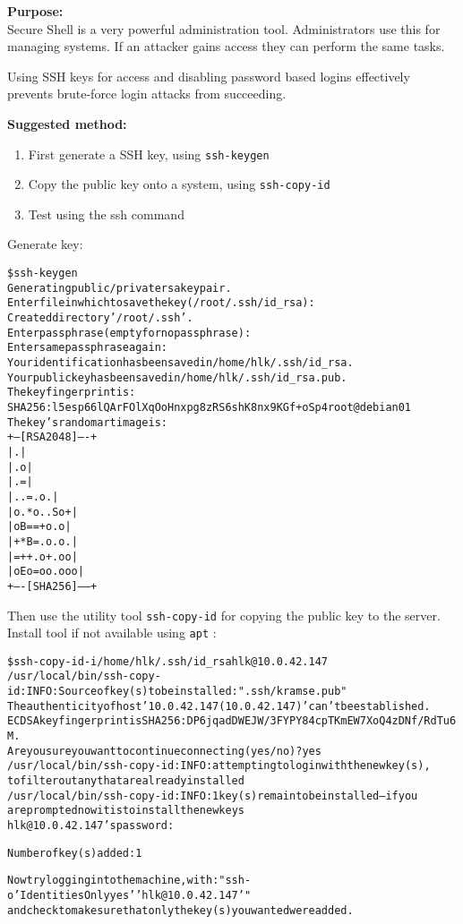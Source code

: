 \documentclass[a4paper,11pt,notitlepage]{report}
\begin{document}
{\bf Purpose:}\\
Secure Shell is a very powerful administration tool. Administrators use this for managing systems. If an attacker gains access they can perform the same tasks.

Using SSH keys for access and disabling password based logins effectively prevents brute-force login attacks from succeeding.

{\bf Suggested method:}\\

\begin{enumerate}
\item First generate a SSH key, using \verb+ssh-keygen+
\item Copy the public key onto a system, using \verb+ssh-copy-id+
\item Test using the ssh command
\end{enumerate}

Generate key:
\begin{alltt}
\$ ssh-keygen
Generating public/private rsa key pair.
Enter file in which to save the key (/root/.ssh/id_rsa):
Created directory '/root/.ssh'.
Enter passphrase (empty for no passphrase):
Enter same passphrase again:
Your identification has been saved in /home/hlk/.ssh/id_rsa.
Your public key has been saved in /home/hlk/.ssh/id_rsa.pub.
The key fingerprint is:
SHA256:l5esp66lQArFOlXqOoHnxpg8zRS6shK8nx9KGf+oSp4 root@debian01
The key's randomart image is:
+---[RSA 2048]----+
|      .          |
|   . o           |
|   .=            |
| ..=.      o .   |
|o.*o. . S o +    |
|oB==+o   . o     |
|+*B=.o.   o .    |
|=++.o +. o o     |
|oEo=oo .ooo      |
+----[SHA256]-----+
\end{alltt}

Then use the utility tool \verb+ssh-copy-id+ for copying the public key to the server. Install tool if not available using \verb+apt+ :
\begin{alltt}
\$ ssh-copy-id -i /home/hlk/.ssh/id_rsa hlk@10.0.42.147
/usr/local/bin/ssh-copy-id: INFO: Source of key(s) to be installed: ".ssh/kramse.pub"
The authenticity of host '10.0.42.147 (10.0.42.147)' can't be established.
ECDSA key fingerprint is SHA256:DP6jqadDWEJW/3FYPY84cpTKmEW7XoQ4zDNf/RdTu6M.
Are you sure you want to continue connecting (yes/no)? yes
/usr/local/bin/ssh-copy-id: INFO: attempting to log in with the new key(s),
to filter out any that are already installed
/usr/local/bin/ssh-copy-id: INFO: 1 key(s) remain to be installed -- if you
are prompted now it is to install the new keys
hlk@10.0.42.147's password:

Number of key(s) added:        1

Now try logging into the machine, with:   "ssh -o 'IdentitiesOnly yes' 'hlk@10.0.42.147'"
and check to make sure that only the key(s) you wanted were added.
\end{alltt}
\end{document}
